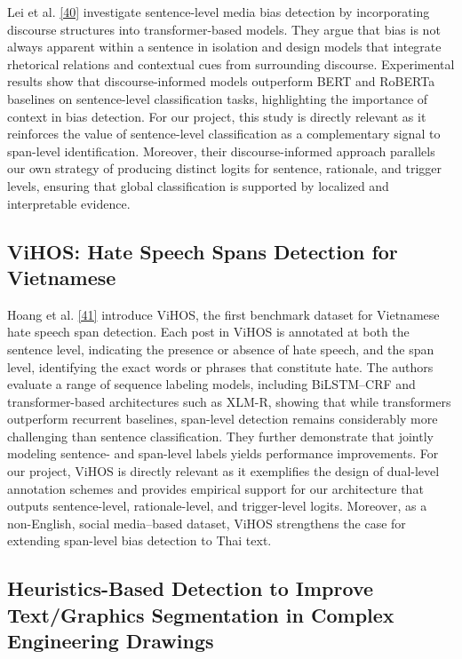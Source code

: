 \documentclass[12pt,oneside,openright,a4paper]{cpe-english-project}
\begin{document}
Lei et al. \hyperlink{bib:ref40}{[40]} investigate sentence-level media bias detection by incorporating discourse structures into transformer-based models. They argue that bias is not always apparent within a sentence in isolation and design models that integrate rhetorical relations and contextual cues from surrounding discourse. Experimental results show that discourse-informed models outperform BERT and RoBERTa baselines on sentence-level classification tasks, highlighting the importance of context in bias detection. For our project, this study is directly relevant as it reinforces the value of sentence-level classification as a complementary signal to span-level identification. Moreover, their discourse-informed approach parallels our own strategy of producing distinct logits for sentence, rationale, and trigger levels, ensuring that global classification is supported by localized and interpretable evidence.

\subsection{ViHOS: Hate Speech Spans Detection for Vietnamese}

Hoang et al. \hyperlink{bib:ref41}{[41]} introduce ViHOS, the first benchmark dataset for Vietnamese hate speech span detection. Each post in ViHOS is annotated at both the sentence level, indicating the presence or absence of hate speech, and the span level, identifying the exact words or phrases that constitute hate. The authors evaluate a range of sequence labeling models, including BiLSTM--CRF and transformer-based architectures such as XLM-R, showing that while transformers outperform recurrent baselines, span-level detection remains considerably more challenging than sentence classification. They further demonstrate that jointly modeling sentence- and span-level labels yields performance improvements. For our project, ViHOS is directly relevant as it exemplifies the design of dual-level annotation schemes and provides empirical support for our architecture that outputs sentence-level, rationale-level, and trigger-level logits. Moreover, as a non-English, social media--based dataset, ViHOS strengthens the case for extending span-level bias detection to Thai text.

\subsection{Heuristics-Based Detection to Improve Text/Graphics Segmentation in Complex Engineering Drawings}
\end{document}

